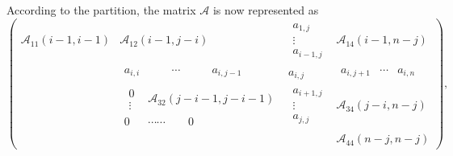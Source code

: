 \documentclass[10pt,a4paper]{amsart}
\numberwithin{equation}{section}
\def\A{\mathscr{A}}
\begin{document}
According to the partition, the matrix $\A$ is now represented as
\begin{equation}\label{eqn-A}
 \left(
 \begin{array}{c|c|c|c}
 \A_{11}(i-1,i-1) & \A_{12}(i-1,j-i) &
 \begin{array}{c} a_{1,j}\\ \vdots \\ a_{i-1, j} \end{array}
& \A_{14}(i-1,n-j)\\
 \hline
 \begin{array}{ccc} & & \end{array} &
 \begin{array}{lcl} a_{i,i} \quad & \quad \cdots \quad & \quad a_{i,j-1} \end{array}
 & a_{i, j} &
 \begin{array}{ccc} a_{i, j+1} & \cdots & a_{i, n} \end{array}
 \\
 \hline
 \begin{array}{ccc} & & \\
 & & \\
 & & \end{array} & \begin{array}{cc} \begin{array}{c}
 0\\
 \vdots
 \end{array}&
 \A_{32}(j-i-1,j-i-1)\\ 0&\cdots\cdots \qquad 0\end{array}
 &
 \begin{array}{c} a_{i+1, j}\\ \vdots \\ a_{j, j}\end{array}
 & \A_{34}(j-i,n-j)\\
 \hline
 \begin{array}{ccc} & & \\
 & & \\
 & & \end{array} & \begin{array}{ccc} & & \\
 & & \\
 & & \end{array} & \begin{array}{ccc} & & \\
 & & \\
 & & \end{array} & \A_{44}(n-j,n-j)
 \end{array}
 \right),
\end{equation}
\end{document}
